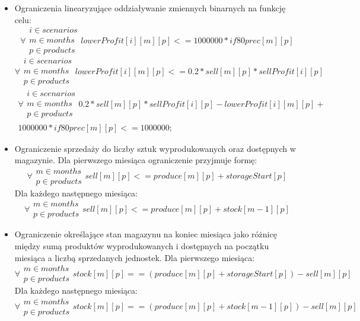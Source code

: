 \begin{itemize}
    \item Ograniczenia linearyzujące oddziaływanie zmiennych binarnych na funkcję celu:
	\begin{equation}
		\forall{\substack{
			i \in scenarios\\			
			m \in months\\ 
			p \in products}} lowerProfit[i][m][p] <= 1000000 * if80prec[m][p]
	\end{equation}
	\begin{equation}
		\forall{\substack{
			i \in scenarios\\			
			m \in months\\ 
			p \in products}} lowerProfit[i][m][p] <= 0.2 * sell[m][p]*sellProfit[i][p]
	\end{equation}
	\begin{multline}
		\forall{\substack{
			i \in scenarios\\			
			m \in months\\ 
			p \in products}} 0.2 * sell[m][p]*sellProfit[i][p] - lowerProfit[i][m][p] +\\ 1000000 * if80prec[m][p] <= 1000000;
	\end{multline}
	
    \item Ograniczenie sprzedaży do liczby sztuk wyprodukowanych oraz dostępnych w magazynie. Dla pierwszego miesiąca ograniczenie przyjmuje formę:
	\begin{equation}
		\forall{\substack{
			m \in months\\ 
			p \in products}} sell[m][p] <= produce[m][p]+storageStart[p]
	\end{equation}
	Dla każdego następnego miesiąca:
	\begin{equation}
		\forall{\substack{
			m \in months\\ 
			p \in products}} sell[m][p] <= produce[m][p] + stock[m-1][p]
	\end{equation}
	
    \item Ograniczenie określające stan magazynu na koniec miesiąca jako różnicę między sumą produktów wyprodukowanych i dostępnych na początku miesiąca a liczbą sprzedanych jednostek. Dla pierwszego miesiąca:
	\begin{equation}
		\forall{\substack{
			m \in months\\ 
			p \in products}} stock[m][p]==(produce[m][p] + storageStart[p])-sell[m][p]
	\end{equation}
	Dla każdego następnego miesiąca:
	\begin{equation}
		\forall{\substack{
			m \in months\\ 
			p \in products}} stock[m][p]==(produce[m][p] + stock[m-1][p])-sell[m][p]
	\end{equation}

\end{itemize}
